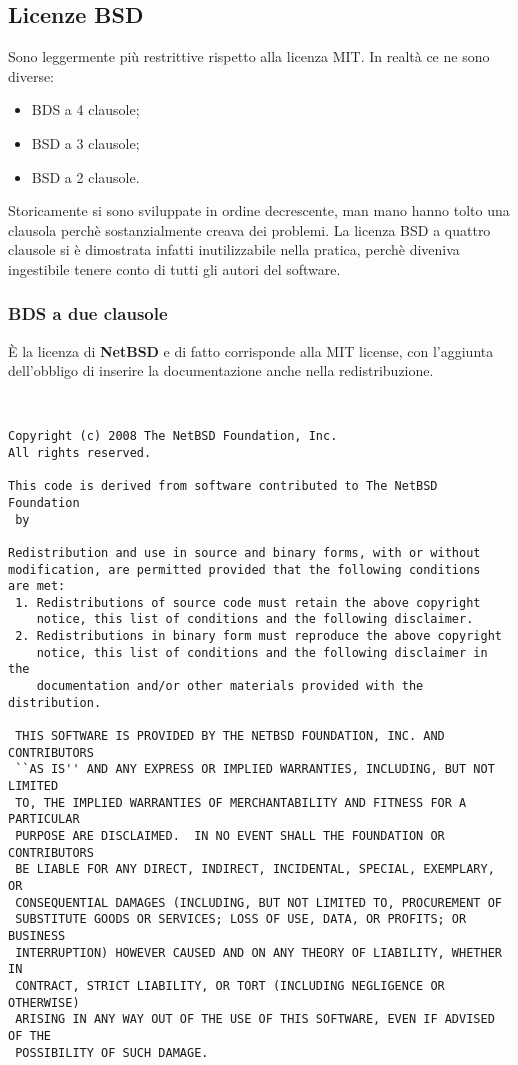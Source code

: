 \subsection{Licenze BSD}

Sono leggermente più restrittive rispetto alla licenza MIT. In realtà ce ne sono diverse:

\begin{itemize}

\item BDS a 4 clausole;
\item BSD a 3 clausole;
\item BSD a 2 clausole.

\end{itemize}

Storicamente si sono sviluppate in ordine decrescente, man mano hanno tolto una clausola perchè sostanzialmente creava dei problemi. La licenza BSD a quattro clausole si è dimostrata infatti inutilizzabile nella pratica, perchè diveniva ingestibile tenere conto di tutti gli autori del software. 

\subsubsection{BDS a due clausole}

È la licenza di \textbf{NetBSD} e di fatto corrisponde alla MIT license, con l'aggiunta dell'obbligo di inserire la documentazione anche nella redistribuzione.

\begin{lstlisting}[caption=BSD a due clausole (NetBDS)]


Copyright (c) 2008 The NetBSD Foundation, Inc.
All rights reserved.

This code is derived from software contributed to The NetBSD Foundation
 by 

Redistribution and use in source and binary forms, with or without
modification, are permitted provided that the following conditions
are met:
 1. Redistributions of source code must retain the above copyright
    notice, this list of conditions and the following disclaimer.
 2. Redistributions in binary form must reproduce the above copyright
    notice, this list of conditions and the following disclaimer in the
    documentation and/or other materials provided with the distribution.

 THIS SOFTWARE IS PROVIDED BY THE NETBSD FOUNDATION, INC. AND CONTRIBUTORS
 ``AS IS'' AND ANY EXPRESS OR IMPLIED WARRANTIES, INCLUDING, BUT NOT LIMITED
 TO, THE IMPLIED WARRANTIES OF MERCHANTABILITY AND FITNESS FOR A PARTICULAR
 PURPOSE ARE DISCLAIMED.  IN NO EVENT SHALL THE FOUNDATION OR CONTRIBUTORS
 BE LIABLE FOR ANY DIRECT, INDIRECT, INCIDENTAL, SPECIAL, EXEMPLARY, OR
 CONSEQUENTIAL DAMAGES (INCLUDING, BUT NOT LIMITED TO, PROCUREMENT OF
 SUBSTITUTE GOODS OR SERVICES; LOSS OF USE, DATA, OR PROFITS; OR BUSINESS
 INTERRUPTION) HOWEVER CAUSED AND ON ANY THEORY OF LIABILITY, WHETHER IN
 CONTRACT, STRICT LIABILITY, OR TORT (INCLUDING NEGLIGENCE OR OTHERWISE)
 ARISING IN ANY WAY OUT OF THE USE OF THIS SOFTWARE, EVEN IF ADVISED OF THE
 POSSIBILITY OF SUCH DAMAGE.

 \end{lstlisting}

